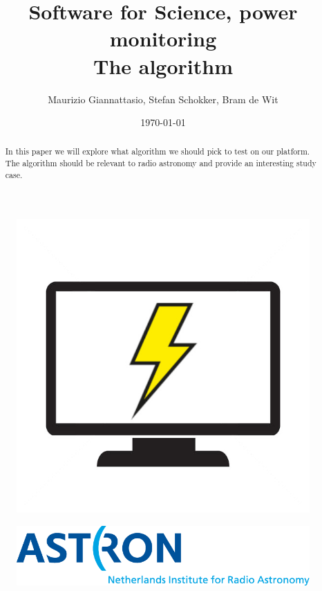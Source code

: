 \documentclass[11pt, A4, oneside]{article}
\title{Software for Science, power monitoring \\ The algorithm \\}
\author{Maurizio Giannattasio, Stefan Schokker, Bram de Wit}
\date{\today}
\begin{document}
\begin{titlepage}
	\maketitle
	
	\begin{figure}[htbp]
		\centering
		\includegraphics{PowerMonitoring_logo}
	\end{figure}	
	\begin{figure}[htbp]
		\centering
		\includegraphics{Logo-astron}
	\end{figure}

\end{titlepage}


\begin{abstract}
	
In this paper we will explore what algorithm we should pick to test on our platform. The algorithm should be relevant to radio astronomy and provide an interesting study case. 
	
\end{abstract}
\end{document}
